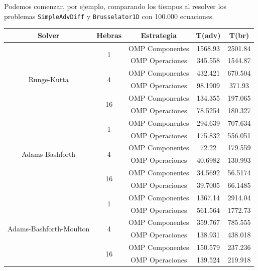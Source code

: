 Podemos comenzar, por ejemplo, comparando los tiempos al resolver los problemas \texttt{SimpleAdvDiff} y \texttt{Brusselator1D} con 100.000 ecuaciones.
\begin{table}[H]
	\begin{center}
		\begin{tabular}{| c | c | c | c | c |}
			\hline
			\textbf{Solver} & \textbf{Hebras} & \textbf{Estrategia} & \textbf{T(adv)} & \textbf{T(br)} \\
			\hline
			
			\multirow{6}{*}{Runge-Kutta}
			& \multirow{2}{*}{1}  & OMP Componentes   & 1568.93  & 2501.84 \\
			\cline{3-5}
			&                     & OMP Operaciones   & 345.558  & 1544.87 \\
			\cline{2-5}
			& \multirow{2}{*}{4}  & OMP Componentes   & 432.421  & 670.504 \\
			\cline{3-5}
			&                     & OMP Operaciones   & 98.1909  & 371.93 \\
			\cline{2-5}
			& \multirow{2}{*}{16} & OMP Componentes   & 134.355  & 197.065 \\
			\cline{3-5}
			&                     & OMP Operaciones   & 78.5254  & 180.327 \\
			\hline
			
			\multirow{6}{*}{Adams-Bashforth}
			& \multirow{2}{*}{1}  & OMP Componentes   & 294.639  & 707.634 \\
			\cline{3-5}
			&                     & OMP Operaciones   & 175.832  & 556.051 \\
			\cline{2-5}
			& \multirow{2}{*}{4}  & OMP Componentes   & 72.22    & 179.559 \\
			\cline{3-5}
			&                     & OMP Operaciones   & 40.6982  & 130.993 \\
			\cline{2-5}
			& \multirow{2}{*}{16} & OMP Componentes   & 34.5692  & 56.5174 \\
			\cline{3-5}
			&                     & OMP Operaciones   & 39.7005  & 66.1485 \\
			\hline
			
			\multirow{6}{*}{Adams-Bashforth-Moulton}
			& \multirow{2}{*}{1}  & OMP Componentes   & 1367.14  & 2914.04 \\
			\cline{3-5}
			&                     & OMP Operaciones   & 561.564  & 1772.73 \\
			\cline{2-5}
			& \multirow{2}{*}{4}  & OMP Componentes   & 359.767  & 785.555 \\
			\cline{3-5}
			&                     & OMP Operaciones   & 138.931  & 438.018 \\
			\cline{2-5}
			& \multirow{2}{*}{16} & OMP Componentes   & 150.579  & 237.236 \\
			\cline{3-5}
			&                     & OMP Operaciones   & 139.524  & 219.918 \\
			\hline
			

\end{tabular}
\end{center}
\end{table}
